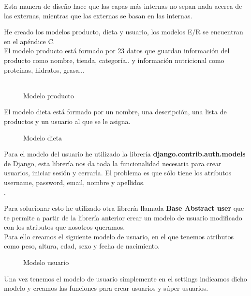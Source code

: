 Esta manera de diseño hace que las capas más internas no sepan nada acerca de las externas, mientras que las externas se basan en las internas.

He creado los modelos producto, dieta y usuario, los modelos E/R se encuentran en el apéndice C.\\
El modelo producto está formado por 23 datos que guardan información del producto como nombre, tienda, categoría.. y información nutricional como proteinas, hidratos, grasa...\\\\

\begin{figure}[H]
  \centering
  \noindent{}
  \caption{Modelo producto}
\end{figure}

El modelo dieta está formado por un nombre, una descripción, una lista de productos y un usuario al que se le asigna.\\

\begin{figure}[H]
  \centering
  \noindent{}
  \caption{Modelo dieta}
\end{figure}

Para el modelo del usuario he utilizado la librería \textbf{django.contrib.auth.models} de Django, 
esta librería nos da toda la funcionalidad necesaria para crear usuarios, iniciar sesión y cerrarla. 
El problema es que sólo tiene los atributos username, password, email, nombre y apellidos.\\.

Para solucionar esto he utilizado otra librería llamada \textbf{Base Abstract user} que te permite a partir 
de la librería anterior crear un modelo de usuario modificado con los atributos que nosotros queramos.\\

Para ello creamos el siguiente modelo de usuario, en el que tenemos atributos como peso, altura, edad, sexo y fecha de nacimiento.

\begin{figure}[H]
  \centering
  \noindent{}
  \caption{Modelo usuario}
\end{figure}

Una vez tenemos el modelo de usuario simplemente en el settings indicamos dicho modelo y creamos las funciones 
para crear usuarios y súper usuarios.\\

